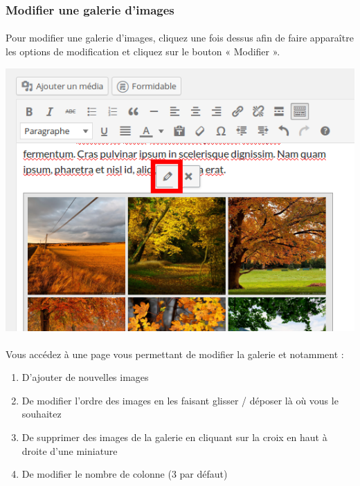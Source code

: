 \documentclass[10pt,a4paper]{article}
\begin{document}
\subsubsection{Modifier une galerie d'images}
\paragraph{}Pour modifier une galerie d'images, cliquez une fois dessus afin de faire apparaître les options de modification et cliquez sur le bouton « Modifier ».
\begin{center}
\includegraphics[scale=0.3]{img/0118.png}
\end{center}
\paragraph{}Vous accédez à une page vous permettant de modifier la galerie et notamment :
\begin{enumerate}
\item D'ajouter de nouvelles images
\item De modifier l'ordre des images en les faisant glisser / déposer là où vous le souhaitez
\item De supprimer des images de la galerie en cliquant sur la croix en haut à droite d'une miniature
\item De modifier le nombre de colonne (3 par défaut)
\end{enumerate}
\end{document}
